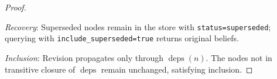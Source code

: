 \documentclass[11pt,letterpaper]{article}
\begin{document}
\begin{proof} \

\textit{Recovery}: Superseded nodes remain in the store with \texttt{status=superseded}; querying with \texttt{include\_superseded=true} returns original beliefs.

\textit{Inclusion}: Revision propagates only through $\operatorname{deps}(n)$. The nodes not in transitive closure of $\operatorname{deps}$ remain unchanged, satisfying inclusion.
\end{proof}
\end{document}
